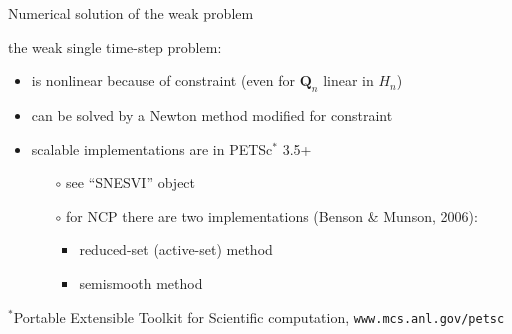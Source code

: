 \documentclass[xcolor={dvipsnames}]{beamer}
\newcommand\bQ{\mathbf{Q}}
\begin{document}
\begin{frame}{Numerical solution of the weak problem}

the weak single time-step problem:
\begin{itemize}
\item is nonlinear because of constraint (even for $\bQ_n$ linear in $H_n$)
\item can be solved by a Newton method modified for constraint
\item scalable implementations are in PETSc$^*$ 3.5+
  \begin{itemize}
  \item[$\circ$]  see ``SNESVI'' object
  \item[$\circ$]  for NCP there are two implementations (Benson \& Munson, 2006):
    \begin{itemize}
    \item  reduced-set (active-set) method
    \item  semismooth method
    \end{itemize}
  \end{itemize}
\end{itemize}

\vspace{15mm}
{\scriptsize $^*$Portable Extensible Toolkit for Scientific computation, \texttt{www.mcs.anl.gov/petsc}}
\end{frame}
\end{document}
